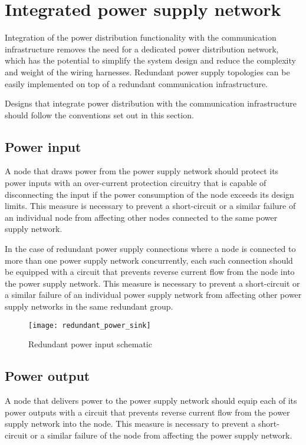 \chapter{Integrated power supply network}\label{sec:power}

Integration of the power distribution functionality with the communication infrastructure
removes the need for a dedicated power distribution network,
which has the potential to simplify the system design and reduce the complexity and weight of the wiring harnesses.
Redundant power supply topologies can be easily implemented on top of a redundant communication infrastructure.

Designs that integrate power distribution with the communication infrastructure should follow the
conventions set out in this section.

\section{Power input}

A node that draws power from the power supply network should protect its power inputs
with an over-current protection circuitry that is capable of disconnecting the input
if the power consumption of the node exceeds its design limits.
This measure is necessary to prevent a short-circuit or a similar failure of an individual node from affecting
other nodes connected to the same power supply network.

In the case of redundant power supply connections where a node is connected to more than one power supply network
concurrently, each such connection should be equipped with a circuit that prevents reverse current flow
from the node into the power supply network.
This measure is necessary to prevent a short-circuit or a similar failure of an individual power supply network
from affecting other power supply networks in the same redundant group.

\begin{figure}[H]
    \centering
    \texttt{[image: redundant\_power\_sink]}
    \caption{Redundant power input schematic}
\end{figure}

\section{Power output}

A node that delivers power to the power supply network should equip each of its power outputs
with a circuit that prevents reverse current flow from the power supply network into the node.
This measure is necessary to prevent a short-circuit or a similar failure of the node from affecting
the power supply network.

